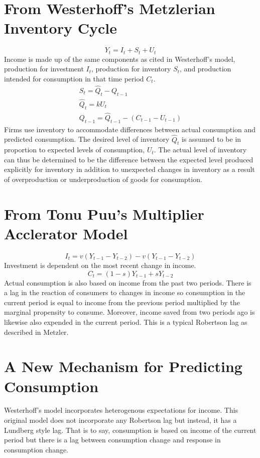 \documentclass[]{article}
\begin{document}
\section*{From Westerhoff's Metzlerian Inventory Cycle}
\begin{equation}
	Y_t=I_t+S_t+U_t
\end{equation}
Income is made up of the same components as cited in Westerhoff's model, production for investment $I_t$, production for inventory $S_t$, and production intended for consumption in that time period $C_t$.
\begin{gather}
	S_t=\hat Q_t -Q_{t-1}\\
	\hat Q_t=k U_t\\
	Q_{t-1}=\hat Q_{t-1}-(C_{t-1}-U_{t-1})
\end{gather}
Firms use inventory to accommodate differences between actual consumption and predicted consumption. The desired level of inventory $\hat Q_t$ is assumed to be in proportion to expected levels of consumption, $U_t$. The actual level of inventory can thus be determined to be the difference between the expected level produced explicitly for inventory in addition to unexpected changes in inventory as a result of overproduction or underproduction of goods for consumption.
\section*{From Tonu Puu's Multiplier Acclerator Model}
\begin{equation}
	I_t=v(Y_{t-1}-Y_{t-2})-v(Y_{t-1}-Y_{t-2})
\end{equation}
Investment is dependent on the most recent change in income.
\begin{equation}
	C_t=(1-s)Y_{t-1}+sY_{t-2}
\end{equation}
Actual consumption is also based on income from the past two periods. There is a lag in the reaction of consumers to changes in income so consumption in the current period is equal to income from the previous period multiplied by the marginal propensity to consume. Moreover, income saved from two periods ago is likewise also expended in the current period. This is a typical Robertson lag as described in Metzler.
\section*{A New Mechanism for Predicting Consumption}
Westerhoff's model incorporates heterogenous expectations for income. This original model does not incorporate any Robertson lag but instead, it has a Lundberg style lag. That is to say, consumption is based on income of the current period but there is a lag between consumption change and response in consumption change. 
\end{document}
